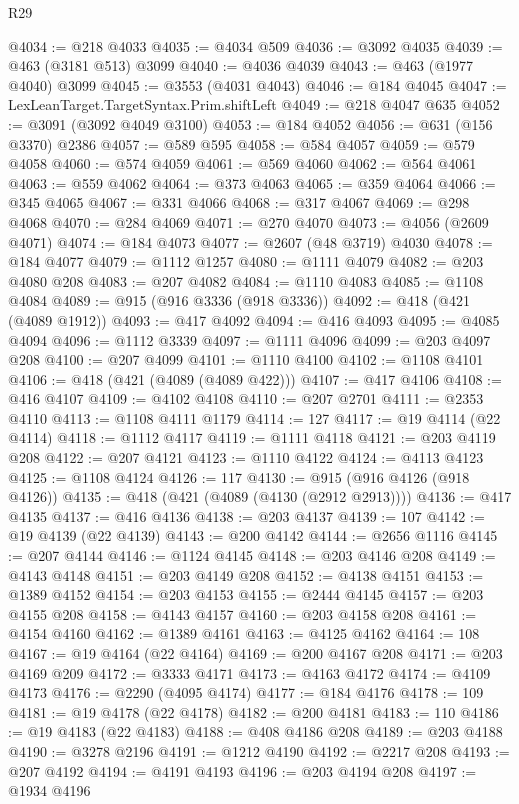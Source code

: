 \begin{lexlean}{R29}
\begin{coremodule}
@4034 := @218 @4033
@4035 := @4034 @509
@4036 := @3092 @4035
@4039 := @463 (@3181 @513) @3099
@4040 := @4036 @4039
@4043 := @463 (@1977 @4040) @3099
@4045 := @3553 (@4031 @4043)
@4046 := @184 @4045
@4047 := LexLeanTarget.TargetSyntax.Prim.shiftLeft
@4049 := @218 @4047 @635
@4052 := @3091 (@3092 @4049 @3100)
@4053 := @184 @4052
@4056 := @631 (@156 @3370) @2386
@4057 := @589 @595
@4058 := @584 @4057
@4059 := @579 @4058
@4060 := @574 @4059
@4061 := @569 @4060
@4062 := @564 @4061
@4063 := @559 @4062
@4064 := @373 @4063
@4065 := @359 @4064
@4066 := @345 @4065
@4067 := @331 @4066
@4068 := @317 @4067
@4069 := @298 @4068
@4070 := @284 @4069
@4071 := @270 @4070
@4073 := @4056 (@2609 @4071)
@4074 := @184 @4073
@4077 := @2607 (@48 @3719) @4030
@4078 := @184 @4077
@4079 := @1112 @1257
@4080 := @1111 @4079
@4082 := @203 @4080 @208
@4083 := @207 @4082
@4084 := @1110 @4083
@4085 := @1108 @4084
@4089 := @915 (@916 @3336 (@918 @3336))
@4092 := @418 (@421 (@4089 @1912))
@4093 := @417 @4092
@4094 := @416 @4093
@4095 := @4085 @4094
@4096 := @1112 @3339
@4097 := @1111 @4096
@4099 := @203 @4097 @208
@4100 := @207 @4099
@4101 := @1110 @4100
@4102 := @1108 @4101
@4106 := @418 (@421 (@4089 (@4089 @422)))
@4107 := @417 @4106
@4108 := @416 @4107
@4109 := @4102 @4108
@4110 := @207 @2701
@4111 := @2353 @4110
@4113 := @1108 @4111 @1179
@4114 := 127
@4117 := @19 @4114 (@22 @4114)
@4118 := @1112 @4117
@4119 := @1111 @4118
@4121 := @203 @4119 @208
@4122 := @207 @4121
@4123 := @1110 @4122
@4124 := @4113 @4123
@4125 := @1108 @4124
@4126 := 117
@4130 := @915 (@916 @4126 (@918 @4126))
@4135 := @418 (@421 (@4089 (@4130 (@2912 @2913))))
@4136 := @417 @4135
@4137 := @416 @4136
@4138 := @203 @4137
@4139 := 107
@4142 := @19 @4139 (@22 @4139)
@4143 := @200 @4142
@4144 := @2656 @1116
@4145 := @207 @4144
@4146 := @1124 @4145
@4148 := @203 @4146 @208
@4149 := @4143 @4148
@4151 := @203 @4149 @208
@4152 := @4138 @4151
@4153 := @1389 @4152
@4154 := @203 @4153
@4155 := @2444 @4145
@4157 := @203 @4155 @208
@4158 := @4143 @4157
@4160 := @203 @4158 @208
@4161 := @4154 @4160
@4162 := @1389 @4161
@4163 := @4125 @4162
@4164 := 108
@4167 := @19 @4164 (@22 @4164)
@4169 := @200 @4167 @208
@4171 := @203 @4169 @209
@4172 := @3333 @4171
@4173 := @4163 @4172
@4174 := @4109 @4173
@4176 := @2290 (@4095 @4174)
@4177 := @184 @4176
@4178 := 109
@4181 := @19 @4178 (@22 @4178)
@4182 := @200 @4181
@4183 := 110
@4186 := @19 @4183 (@22 @4183)
@4188 := @408 @4186 @208
@4189 := @203 @4188
@4190 := @3278 @2196
@4191 := @1212 @4190
@4192 := @2217 @208
@4193 := @207 @4192
@4194 := @4191 @4193
@4196 := @203 @4194 @208
@4197 := @1934 @4196

\end{coremodule}
\end{lexlean}
